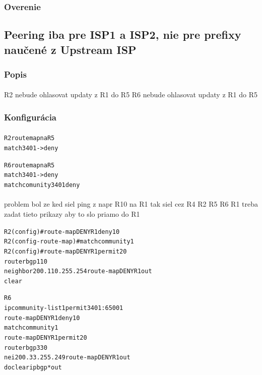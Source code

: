 \documentclass[12pt,twoside,a4paper]{report}
\begin{document}
\subsubsection{Overenie}
\paragraph{}







\subsection{Peering iba pre ISP1 a ISP2, nie pre prefixy naučené z Upstream ISP}
\subsubsection{Popis}
\paragraph{}
R2 nebude ohlasovat updaty z R1 do R5
R6 nebude ohlasovat updaty z R1 do R5

\subsubsection{Konfigurácia}
\paragraph{}

\noindent
{\selectfont
\begin{small}
\begin{alltt}
R2 route map na R5
match 3401 -> deny

R6 route map na R5
match 3401 -> deny
match comunity 3401 deny
\end{alltt}
\end{small}
}

\paragraph{}
problem bol ze ked siel ping z napr R10 na R1 tak siel cez R4 R2 R5 R6 R1
treba zadat tieto prikazy aby to slo priamo do R1

\noindent
{\selectfont
\begin{small}
\begin{alltt}
R2(config)#route-map DENYR1 deny 10
R2(config-route-map)#match community 1
R2(config)#route-map DENYR1 permit 20
router bgp 110
 neighbor 200.110.255.254 route-map DENYR1 out
clear


R6
ip community-list 1 permit 3401:65001
route-map DENYR1 deny 10
 match community 1
route-map DENYR1 permit 20
router bgp 330
 nei 200.33.255.249 route-map DENYR1 out
do clear ip bgp * out
\end{alltt}
\end{small}
}
\end{document}
